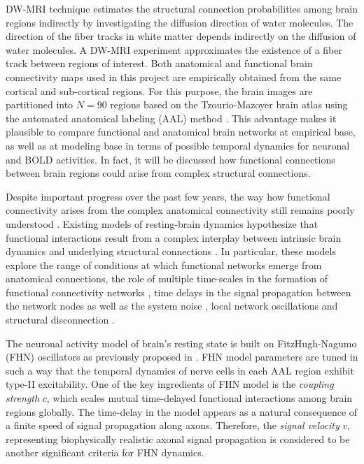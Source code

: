 DW-MRI technique estimates the structural connection probabilities among brain regions indirectly by investigating the diffusion direction of water molecules. The direction of the fiber tracks in white matter depends indirectly on the diffusion of water molecules. A DW-MRI experiment approximates the existence of a fiber track between regions of interest. Both anatomical and functional brain connectivity maps used in this project are empirically obtained from the same cortical and sub-cortical regions. For this purpose, the brain images are partitioned into $N=90$ regions based on the Tzourio-Mazoyer brain atlas using the automated anatomical labeling (AAL) method \citep{TZO02}. This advantage makes it plausible to compare functional and anatomical brain networks at empirical base, as well as at modeling base in terms of possible temporal dynamics for neuronal and BOLD activities. In fact, it will be discussed how functional connections between brain regions could arise from complex structural connections. 

Despite important progress over the past few years, the way how functional connectivity arises from the complex anatomical connectivity still remains poorly understood \citep{VUK14}. Existing models of resting-brain dynamics hypothesize that functional interactions result from a complex interplay between intrinsic brain dynamics and underlying structural connections \citep{RUB09}. In particular, these models explore the range of conditions at which functional networks emerge from anatomical connections, the role of multiple time-scales in the formation of functional connectivity networks \citep{HON07}, time delays in the signal propagation between the network nodes as well as the system noise \citep{GHO08, GHO08a}, local network oscillations \citep{DEC09, CAB11} and structural disconnection \citep{CAB12}.

The neuronal activity model of brain's resting state is built on FitzHugh-Nagumo (FHN) oscillators as  previously proposed in \citep{VUK13, VUK14}. FHN model parameters are tuned in such a way that the temporal dynamics of nerve cells in each AAL region exhibit type-II excitability. One of the key ingredients of FHN model is the \textit{coupling strength} $c$, which scales mutual time-delayed functional interactions among brain regions globally. The time-delay in the model appears as a natural consequence of a finite speed of signal propagation along axons. Therefore, the \textit{signal velocity} $v$, representing biophysically realistic axonal signal propagation \citep{GHO08, GHO08a, DEC09} is considered to be another significant criteria for FHN dynamics. 


